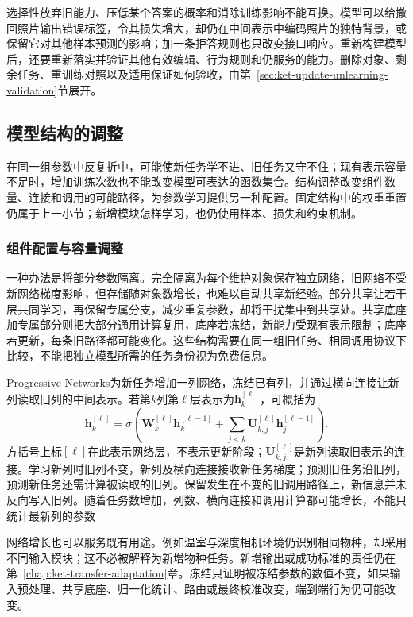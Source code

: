 选择性放弃旧能力、压低某个答案的概率和消除训练影响不能互换。模型可以给撤回照片输出错误标签，令其损失增大，却仍在中间表示中编码照片的独特背景，或保留它对其他样本预测的影响；加一条拒答规则也只改变接口响应。重新构建模型后，还要重新落实并验证其他有效编辑、行为规则和仍服务的能力。删除对象、剩余任务、重训练对照以及适用保证如何验收，由第~\ref{sec:ket-update-unlearning-validation}节展开。

\subsection{模型结构的调整}
\label{sec:ket-update-structure}

在同一组参数中反复折中，可能使新任务学不进、旧任务又守不住；现有表示容量不足时，增加训练次数也不能改变模型可表达的函数集合。结构调整改变组件数量、连接和调用的可能路径，为参数学习提供另一种配置。固定结构中的权重重置仍属于上一小节；新增模块怎样学习，也仍使用样本、损失和约束机制。

\subsubsection{组件配置与容量调整}
\label{sec:ket-update-capacity}

一种办法是将部分参数隔离。完全隔离为每个维护对象保存独立网络，旧网络不受新网络梯度影响，但存储随对象数增长，也难以自动共享新经验。部分共享让若干层共同学习，再保留专属分支，减少重复参数，却将干扰集中到共享处。共享底座加专属部分则把大部分通用计算复用，底座若冻结，新能力受现有表示限制；底座若更新，每条旧路径都可能变化。这些结构需要在同一组旧任务、相同调用协议下比较，不能把独立模型所需的任务身份视为免费信息。

Progressive Networks为新任务增加一列网络，冻结已有列，并通过横向连接让新列读取旧列的中间表示。若第$k$列第$\ell$层表示为$\bm h_k^{[\ell]}$，可概括为
\[
\bm h_k^{[\ell]}
=\sigma\!\left(
\bm W_k^{[\ell]}\bm h_k^{[\ell-1]}
+\sum_{j<k}\bm U_{k,j}^{[\ell]}\bm h_j^{[\ell-1]}
\right).
\]
方括号上标$[\ell]$在此表示网络层，不表示更新阶段；$\bm U_{k,j}^{[\ell]}$是新列读取旧表示的连接。学习新列时旧列不变，新列及横向连接接收新任务梯度；预测旧任务沿旧列，预测新任务还需计算被读取的旧列。保留发生在不变的旧调用路径上，新信息并未反向写入旧列。随着任务数增加，列数、横向连接和调用计算都可能增长，不能只统计最新列的参数

网络增长也可以服务既有用途。例如温室与深度相机环境仍识别相同物种，却采用不同输入模块；这不必被解释为新增物种任务。新增输出或成功标准的责任仍在第~\ref{chap:ket-transfer-adaptation}章。冻结只证明被冻结参数的数值不变，如果输入预处理、共享底座、归一化统计、路由或最终校准改变，端到端行为仍可能改变。

